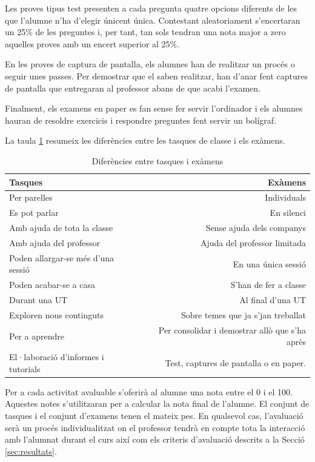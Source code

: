 \documentclass[catalan, a4paper, 12pt, titlepage]{article}
\begin{document}
Les proves tipus test presenten a cada pregunta quatre opcions diferents de les que l'alumne n'ha d'elegir únicent única.
Contestant aleatoriament s'encertaran un 25\% de les preguntes i, per tant, tan sols tendran una nota major a zero aquelles proves amb un encert superior al 25\%.

En les proves de captura de pantalla, els alumnes han de realitzar un procés o seguir unes passes.
Per demostrar que el saben realitzar, han d'anar fent captures de pantalla que entregaran al professor abans de que acabi l'examen.

Finalment, els examens en paper es fan sense fer servir l'ordinador i els alumnes hauran de resoldre exercicis i respondre preguntes fent servir un bolígraf.

La taula \ref{tab:tasquesiexamens} resumeix les diferències entre les tasques de classe i els exàmens.

\begin{table}
        \centering
        \begin{tabular}{lr}
        Tasques & Exàmens\\
        \hline
	Per parelles & Individuals\\
		Es pot parlar & En silenci \\
		Amb ajuda de tota la classe &Sense ajuda dels companys\\
		Amb ajuda del professor & Ajuda del professor limitada\\
		Poden allargar-se més d'una sessió & En una única sessió\\
		Poden acabar-se a casa & S'han de fer a classe\\
		Durant una UT & Al final d'una UT \\
		Exploren nous continguts & Sobre temes que ja s'jan treballat\\
		Per a aprendre & Per consolidar i demostrar allò que s'ha après\\
		El·laboració d'informes i tutorials & Test, captures de pantalla o en paper.

\end{tabular}
        \caption{Diferències entre tasques i exàmens} \label{tab:tasquesiexamens}
\end{table}

Per a cada activitat avaluable s'oferirà al alumne una nota entre el 0 i el 100.
Aquestes notes s'utilitzaran per a calcular la nota final de l'alumne.
El conjunt de tasques i el conjunt d'examens tenen el mateix pes.
En qualsevol cas, l'avaluació serà un procés individualitzat on el professor tendrà en compte tota la interacció amb l'alumnat durant el curs així com els criteris d'avaluació descrits a la Secció \ref{sec:resultats}.
\end{document}
